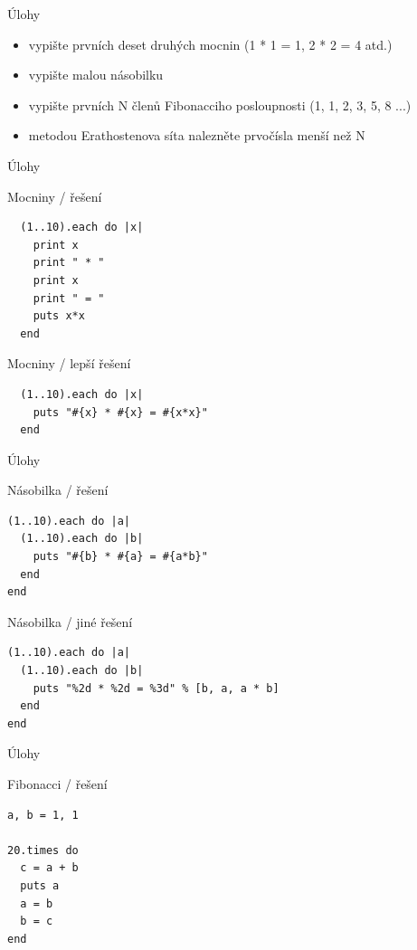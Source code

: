 \documentclass{beamer}
\begin{document}
\begin{frame}{Úlohy}
  \begin{itemize}
    \item vypište prvních deset druhých mocnin (1 * 1 = 1, 2 * 2 = 4 atd.)
    \item vypište malou násobilku
    \item vypište prvních N členů Fibonacciho posloupnosti (1, 1, 2, 3, 5, 8 ...)
    \item metodou Erathostenova síta nalezněte prvočísla menší než N
  \end{itemize}
\end{frame}

\begin{frame}[fragile]{Úlohy}
  \begin{block}{Mocniny / řešení}
\begin{verbatim}
  (1..10).each do |x|
    print x
    print " * "
    print x
    print " = "
    puts x*x
  end
\end{verbatim}
  \end{block}
  \pause
  \begin{block}{Mocniny / lepší řešení}
\begin{verbatim}
  (1..10).each do |x|
    puts "#{x} * #{x} = #{x*x}"
  end
\end{verbatim}
  \end{block}
\end{frame}

\begin{frame}[fragile]{Úlohy}
  \begin{block}{Násobilka / řešení}
\begin{verbatim}
(1..10).each do |a|
  (1..10).each do |b|
    puts "#{b} * #{a} = #{a*b}"
  end
end
\end{verbatim}
  \end{block}
  \pause
  \begin{block}{Násobilka / jiné řešení}
\begin{verbatim}
(1..10).each do |a|
  (1..10).each do |b|
    puts "%2d * %2d = %3d" % [b, a, a * b]
  end
end
\end{verbatim}
  \end{block}
\end{frame}

\begin{frame}[fragile]{Úlohy}
  \begin{block}{Fibonacci / řešení}
\begin{verbatim}
a, b = 1, 1

20.times do
  c = a + b
  puts a
  a = b
  b = c
end
\end{verbatim}
  \end{block}
\end{frame}
\end{document}
